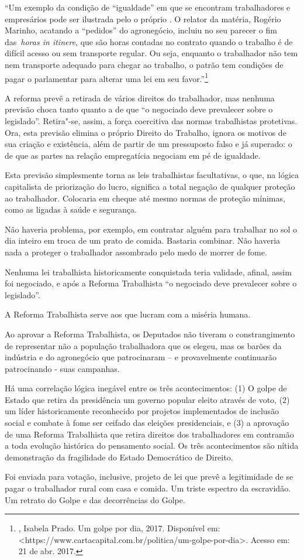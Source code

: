 ``Um exemplo da condição de ``igualdade'' em que se encontram
trabalhadores e empresários pode ser ilustrada pelo o próprio . O
relator da matéria, Rogério Marinho, acatando a ``pedidos'' do
agronegócio, incluiu no seu parecer o fim das~\emph{horas in itinere},
que são horas contadas no contrato quando o trabalho é de difícil acesso
ou sem transporte regular. Ou seja, enquanto o trabalhador não tem nem
transporte adequado para chegar ao trabalho, o patrão tem condições de
pagar o parlamentar para alterar uma lei em seu favor.''\footnote{,
  Isabela Prado. Um golpe por dia, 2017. Disponível
  em:\textless{}https://www.cartacapital.com.br/politica/um-golpe-por-dia\textgreater{}.
  Acesso em: 21 de abr. 2017.}

A reforma prevê a retirada de vários direitos do trabalhador, mas
nenhuma previsão choca tanto quanto a de que ``o negociado deve
prevalecer sobre o legislado''. Retira"-se, assim, a força coercitiva das
normas trabalhistas protetivas. Ora, esta previsão elimina o próprio
Direito do Trabalho, ignora os motivos de sua criação e existência, além
de partir de um pressuposto falso e já superado: o de que as partes na
relação empregatícia negociam em pé de igualdade.

Esta previsão simplesmente torna as leis trabalhistas facultativas, o
que, na lógica capitalista de priorização do lucro, significa a total
negação de qualquer proteção ao trabalhador. Colocaria em cheque até
mesmo normas de proteção mínimas, como as ligadas à saúde e segurança.

Não haveria problema, por exemplo, em contratar alguém para trabalhar no
sol o dia inteiro em troca de um prato de comida. Bastaria combinar. Não
haveria nada a proteger o trabalhador assombrado pelo medo de morrer de
fome.

Nenhuma lei trabalhista historicamente conquistada teria validade,
afinal, assim foi negociado, e após a Reforma Trabalhista ``o negociado
deve prevalecer sobre o legislado''.

A Reforma Trabalhista serve aos que lucram com a miséria humana.

Ao aprovar a Reforma Trabalhista, os Deputados não tiveram o
constrangimento de representar não a população trabalhadora que os
elegeu, mas os barões da indústria e do agronegócio que patrocinaram --
e provavelmente continuarão patrocinando - suas campanhas.

Há uma correlação lógica inegável entre os três acontecimentos: (1) O
golpe de Estado que retira da presidência um governo popular eleito
através de voto, (2) um líder historicamente reconhecido por projetos
implementados de inclusão social e combate à fome ser ceifado das
eleições presidenciais, e (3) a aprovação de uma Reforma Trabalhista que
retira direitos dos trabalhadores em contramão a toda evolução histórica
do pensamento social. Os três acontecimentos são nítida demonstração da
fragilidade do Estado Democrático de Direito.

Foi enviada para votação, inclusive, projeto de lei que prevê a
legitimidade de se pagar o trabalhador rural com casa e comida. Um
triste espectro da escravidão. Um retrato do Golpe e das decorrências do
Golpe.